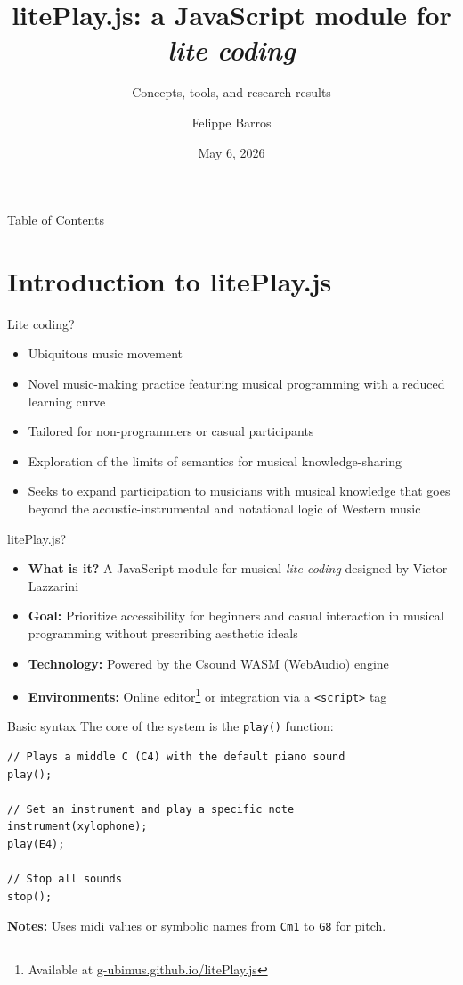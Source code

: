 \documentclass[10pt]{beamer}
\title[litePlay.js]{litePlay.js: a JavaScript module for \textit{lite coding}}
\subtitle{Concepts, tools, and research results}
\author[Felippe Barros]{Felippe Barros}
\institute[] %
{
  PhD candidate in Arts - UFES\\
  Federal University of Espírito Santo/Brazil
}
\date{May 6, 2026}
\begin{document}
\begin{frame}
    \titlepage
\end{frame}

\begin{frame}{Table of Contents}
    \tableofcontents
\end{frame}

\section{Introduction to litePlay.js}
\begin{frame}{Lite coding?}
	\begin{itemize}
		\item Ubiquitous music movement
		\item Novel music-making practice featuring musical programming
			with a reduced learning curve
		\item Tailored for non-programmers or casual participants
		\item Exploration of the limits of semantics for musical knowledge-sharing
		\item Seeks to expand participation to musicians with musical
			knowledge that goes beyond the acoustic-instrumental
			and notational logic of Western music
	\end{itemize}
\end{frame}

\begin{frame}{litePlay.js?}
    \begin{itemize}
	\item \textbf{What is it?} A JavaScript module for musical \textit{lite
		coding} designed by Victor Lazzarini
	\item \textbf{Goal:} Prioritize accessibility for beginners and casual
		interaction in musical programming without prescribing aesthetic ideals
        \item \textbf{Technology:} Powered by the Csound WASM (WebAudio) engine
	\item \textbf{Environments:} Online editor\footnote{Available at
		\url{g-ubimus.github.io/litePlay.js}} or integration via a
		    \texttt{<script>} tag
    \end{itemize}
\end{frame}

\begin{frame}[fragile]{Basic syntax}
    The core of the system is the \texttt{play()} function:
    \begin{lstlisting}
// Plays a middle C (C4) with the default piano sound
play(); 

// Set an instrument and play a specific note
instrument(xylophone);
play(E4);

// Stop all sounds
stop();
    \end{lstlisting}
    \vfill
    \textbf{Notes:} Uses midi values or symbolic names from \texttt{Cm1} to
	\texttt{G8} for pitch.
\end{frame}
\end{document}

